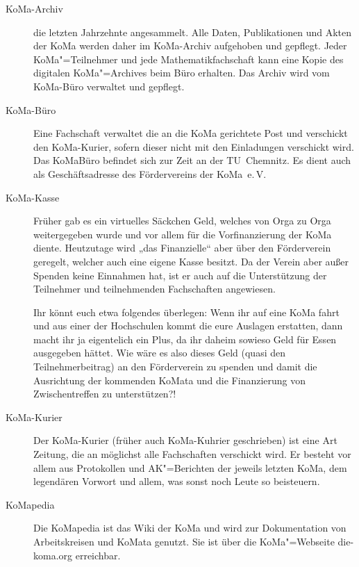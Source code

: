 \begin{description}
\item[KoMa-Archiv] %
	die letzten Jahrzehnte angesammelt. Alle Daten, Publikationen und Akten der
	KoMa werden daher im KoMa-Archiv aufgehoben und gepflegt.  Jeder
	KoMa"=Teilnehmer und jede Mathematikfachschaft kann eine Kopie des digitalen
	KoMa"=Archives beim Büro erhalten. Das Archiv wird vom KoMa-Büro verwaltet
	und gepflegt.

\item[KoMa-Büro] Eine Fachschaft verwaltet die an die KoMa gerichtete Post und
	verschickt den KoMa-Kurier, sofern dieser nicht mit den Einladungen
	verschickt wird. Das KoMaBüro befindet sich zur Zeit an der TU~Chemnitz. %
	Es dient auch als Geschäftsadresse des Fördervereins der KoMa~e.\,V.

\item[KoMa-Kasse] Früher gab es ein virtuelles Säckchen Geld, welches von Orga
	zu Orga weitergegeben wurde und vor allem für die Vorfinanzierung der KoMa
	diente. Heutzutage wird „das Finanzielle“ aber über den Förderverein
	geregelt, welcher auch eine eigene Kasse besitzt. Da der Verein aber außer
	Spenden keine Einnahmen hat, ist er auch auf die Unterstützung der
	Teilnehmer und teilnehmenden Fachschaften angewiesen.

	Ihr könnt euch etwa folgendes überlegen: Wenn ihr auf eine KoMa fahrt und
	aus einer der Hochschulen kommt die eure Auslagen erstatten, dann macht ihr
	ja eigentelich ein Plus, da ihr daheim sowieso Geld für Essen ausgegeben
	hättet.  Wie wäre es also dieses Geld (quasi den Teilnehmerbeitrag) an den
	Förderverein zu spenden und damit die Ausrichtung der kommenden KoMata und
	die Finanzierung von Zwischentreffen zu unterstützen?!

\item[KoMa-Kurier] Der KoMa-Kurier (früher auch KoMa-Kuhrier geschrieben) ist
	eine Art Zeitung, die an möglichst alle Fachschaften verschickt wird. Er
	besteht vor allem aus Protokollen und AK"=Berichten der jeweils letzten
	KoMa, dem legendären Vorwort und allem, was sonst noch Leute so beisteuern.

\item[KoMapedia] Die KoMapedia ist das Wiki der KoMa und wird zur Dokumentation
	von Arbeitskreisen und KoMata genutzt. Sie ist über die KoMa"=Webseite
	die-koma.org erreichbar.


\end{description}

